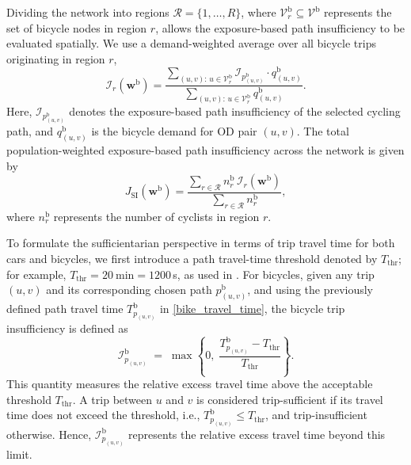 \documentclass[lettersize,journal]{IEEEtran}
\begin{document}
Dividing the network into regions $\mathcal{R} = \{1,\dots,R\}$, where
$\mathcal{V}_r^\mathrm{b} \subseteq \mathcal{V}^\mathrm{b}$ represents the set of
bicycle nodes in region $r$, allows the exposure-based path insufficiency to be
evaluated spatially. We use a demand-weighted average over all bicycle trips
originating in region $r$,
\begin{equation}
    \mathcal{I}_r(\boldsymbol{w}^\mathrm{b})
    =
    \frac{
    \sum_{(u,v):\,u\in\mathcal{V}_r^\mathrm{b}}
    \mathcal{I}_{p_{(u,v)}^\mathrm{b}} \cdot q_{(u,v)}^\mathrm{b}
    }{
    \sum_{(u,v):\,u\in\mathcal{V}_r^\mathrm{b}}
    q_{(u,v)}^\mathrm{b}
    }.
\end{equation}
Here, $\mathcal{I}_{p_{(u,v)}^\mathrm{b}}$ denotes the exposure-based path
insufficiency of the selected cycling path, and $q_{(u,v)}^\mathrm{b}$ is the
bicycle demand for OD pair $(u,v)$. The total population-weighted exposure-based path insufficiency across the network is given by
\begin{equation}
    J_{\mathrm{SI}}(\boldsymbol{w}^\mathrm{b})
    =
    \frac{
    \sum_{r \in \mathcal{R}}
    n_r^\mathrm{b} \, \mathcal{I}_r(\boldsymbol{w}^\mathrm{b})
    }{
    \sum_{r \in \mathcal{R}} n_r^\mathrm{b}
    },
\end{equation}
where $n_r^\mathrm{b}$ represents the number of cyclists in region $r$.

To formulate the sufficientarian perspective in terms of trip travel time for both cars and bicycles, we first introduce a path travel-time threshold denoted by $T_{\mathrm{thr}}$; for example, $T_{\mathrm{thr}} = 20~\text{min} = 1200$\,s, as used in \cite{salazar2024accessibility}. For bicycles, given any trip $(u,v)$ and its corresponding chosen path $p_{(u,v)}^\mathrm{b}$, and using the previously defined path travel time $T_{p_{(u,v)}}^\mathrm{b}$ in \eqref{bike_travel_time}, the bicycle trip insufficiency is defined as
\begin{equation}
\label{eq:time_insufficiency}
\mathcal{I}_{p_{(u,v)}}^\mathrm{b}
\;=\;
\max\!\left\{
0,\;
\frac{T_{p_{(u,v)}}^\mathrm{b} - T_{\mathrm{thr}}}{T_{\mathrm{thr}}}
\right\}.
\end{equation}
This quantity measures the relative excess travel time above the acceptable threshold $T_{\mathrm{thr}}$. A trip between $u$ and $v$ is considered trip-sufficient if its travel time does not exceed the threshold, i.e., $T_{p_{(u,v)}}^\mathrm{b} \leq T_{\mathrm{thr}}$, and trip-insufficient otherwise. Hence, $\mathcal{I}_{p_{(u,v)}}^\mathrm{b}$ represents the relative excess travel time beyond this limit.
\end{document}
